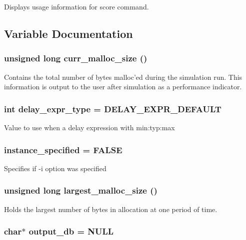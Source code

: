 Displays usage information for score command. 

\subsection{Variable Documentation}
\subsubsection{\setlength{\rightskip}{0pt plus 5cm}unsigned long curr\_\-malloc\_\-size ()}\label{score_8c_a8}


Contains the total number of bytes malloc'ed during the simulation run. This information is output to the user after simulation as a performance indicator. 
\subsubsection{\setlength{\rightskip}{0pt plus 5cm}int delay\_\-expr\_\-type = DELAY\_\-EXPR\_\-DEFAULT}\label{score_8c_a4}


Value to use when a delay expression with min:typ:max 
\subsubsection{ instance\_\-specified = FALSE}\label{score_8c_a6}


Specifies if -i option was specified 
\subsubsection{\setlength{\rightskip}{0pt plus 5cm}unsigned long largest\_\-malloc\_\-size ()}\label{score_8c_a7}


Holds the largest number of bytes in allocation at one period of time. 
\subsubsection{\setlength{\rightskip}{0pt plus 5cm}char$\ast$ output\_\-db = NULL}\label{score_8c_a2}


